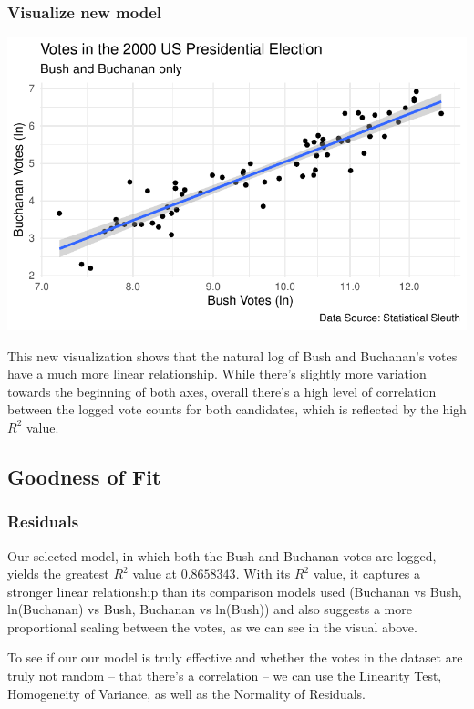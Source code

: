 \documentclass[
  letterpaper,
  DIV=11,
  numbers=noendperiod]{scrartcl}
\begin{document}
\hypertarget{visualize-new-model}{%
\subsubsection{Visualize new model}\label{visualize-new-model}}

\includegraphics{sds-291_s-24_case-study-template_files/figure-pdf/unnamed-chunk-6-1.pdf}

This new visualization shows that the natural log of Bush and Buchanan's
votes have a much more linear relationship. While there's slightly more
variation towards the beginning of both axes, overall there's a high
level of correlation between the logged vote counts for both candidates,
which is reflected by the high \(R^2\) value.

\hypertarget{goodness-of-fit}{%
\subsection{Goodness of Fit}\label{goodness-of-fit}}

\hypertarget{residuals}{%
\subsubsection{Residuals}\label{residuals}}

Our selected model, in which both the Bush and Buchanan votes are
logged, yields the greatest \(R^2\) value at \(0.8658343\). With its
\(R^2\) value, it captures a stronger linear relationship than its
comparison models used (Buchanan vs Bush, ln(Buchanan) vs Bush, Buchanan
vs ln(Bush)) and also suggests a more proportional scaling between the
votes, as we can see in the visual above.

To see if our our model is truly effective and whether the votes in the
dataset are truly not random -- that there's a correlation -- we can use
the Linearity Test, Homogeneity of Variance, as well as the Normality of
Residuals.
\end{document}
